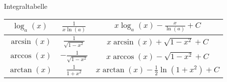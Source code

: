 \begin{lemma}{Integraltabelle}
{\begin{tabular}{c|c|c}
	    \hline
	    \(\log_a(x)\)                             & \(\frac{1}{x\ln(a)}\)                     & \(x\log_a(x)-\frac{x}{\ln(a)}+C\)       \\
	    \hline
	    \(\arcsin(x)\)                            & \(\frac{1}{\sqrt{1-x^2}}\)                & \(x\arcsin(x)+\sqrt{1-x^2}+C\)          \\
	    \hline
	    \(\arccos(x)\)                            & \(-\frac{1}{\sqrt{1-x^2}}\)               & \(x\arccos(x)-\sqrt{1-x^2}+C\)          \\
	    \hline
	    \(\arctan(x)\)                            & \(\frac{1}{1+x^2}\)                       & \(x\arctan(x)-\frac{1}{2}\ln(1+x^2)+C\) \\
	\end{tabular}
    }
\end{lemma}

